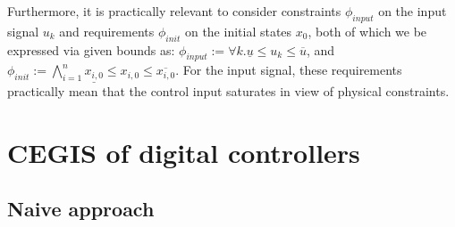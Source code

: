 \documentclass[twocolumn]{autart}    %
\begin{document}
Furthermore, it is practically relevant to consider constraints $\phi_\mathit{input}$ on the input
signal $u_{k}$ and requirements $\phi_\mathit{init}$ on the initial states $x_0$, 
both of which we be expressed via given bounds as: 
$\phi_\mathit{input} := {\forall k.\underline{u} \leq u_{k} \leq \overline{u}} $, 
and $\phi_\mathit{init} := \bigwedge_{i=1}^{n} \underline{x_{i,0}} \leq x_{i,0} \leq \overline{x_{i,0}}$. 
For the input signal, these requirements practically mean that the control input saturates in view of physical constraints. 


\section{CEGIS of digital controllers} 
\label{sssec:cegisdig}

\subsection{Naive approach} 
\label{sssec:naive}
\end{document}
